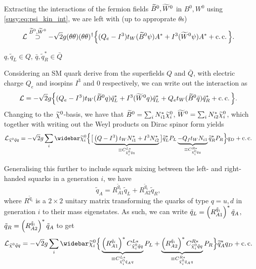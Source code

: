 \documentclass[../main.tex]{subfiles}
\begin{document}
Extracting the interactions of the fermion fields \(\bino, \wino\) in \(B^0,
W^0\) using \cref{susy:eq:psi_kin_int}, we are left with (up to approprate
\(\theta\)s)
\begin{equation}
  \L \stackrel{\bino, \wino}{\supset} -\sqrt{2}g (\theta\theta)(\theta\theta)^\dagger \Big\{ (Q_e - I^3)t_W (\bino \psi) A^\ast + I^3 (\wino \psi) A^\ast + \cc \Big\}.
\end{equation}

\begin{temporary}
  \(q, \tilde{q}_L \in Q\), \(\bar{q}, \tilde{q}_R^\ast \in \bar{Q}\)
\end{temporary}

Considering an SM quark derive from the superfields \(Q\) and \(\bar{Q}\), with
electric charge \(Q_e\) and isospins \(I^3\) and 0 respectively, we can write
out the interaction as
\begin{equation}
  \L = -\sqrt{2}g \Big\{ (Q_e - I^3)t_W (\bino q) \tilde{q}_L^\ast + I^3 (\wino q) \tilde{q}_L^\ast + Q_e t_W (\bino \bar{q}) \tilde{q}_R^\ast + \cc \Big\}.
\end{equation}
Changing to the \(\nino\)-basis, we have that \(\bino = \sum_i N_{i1}^\ast \nino[i]\), \(\wino = \sum_i N_{i2}^\ast \nino[i]\), which together with writing out the Weyl products on Dirac spinor form yields
\begin{equation}
  \label{susy:eq:nino_sf_f_int}
  \L_{\tilde{\chi}^0 \tilde{q}q} = -\sqrt{2} g \sum_{i} \barnino[i] \Big\{ \big[ \underbrace{\pclosed{Q - I^3}t_W N_{i1}^\ast  + I^3 N_{i2}^\ast}_{\equiv C_{\tilde{\chi}^0_i \tilde{q} q}^{L\ast}} \big] \wtilde{q}_L^\ast P_L \underbrace{- Q_f t_W N_{i1}}_{\equiv C_{\tilde{\chi}^0_i \tilde{q} q}^{R\ast}} \wtilde{q}_R^\ast P_R \Big\} q_D + \cc
\end{equation}

Generalising this further to include squark mixing between the left- and
right-handed squarks in a generation \(i\), we have
\begin{equation}
  \tilde{q}_A = R_{A1}^{\tilde{q}_i} \tilde{q}_L + R_{A2}^{\tilde{q}_i} \tilde{q}_R,
\end{equation}
where \(R^{\tilde{q}_i}\) is a \(2\times 2\) unitary matrix transforming the quarks of type \(q = u, d\) in generation \(i\) to their mass eigenstates.
As such, we can write \(\tilde{q}_L = \pclosed{R^{\tilde{q}_i}_{A1}}^\ast \tilde{q}_A\), \(\tilde{q}_R = \pclosed{R^{\tilde{q}_i}_{A2}}^\ast \tilde{q}_A\) to get
\begin{equation}
  \label{susy:eq:nino_sqA_f_int}
  \L_{\tilde{\chi}^0 \tilde{q} q} = -\sqrt{2} g \sum_{i} \barnino[i] \Big\{ \underbrace{\pclosed{R^{\tilde{q}_i}_{A1}}^\ast C_{\tilde{\chi}^0_i \tilde{q} q}^{L\ast}}_{\equiv C_{\tilde{\chi}^0_i \tilde{q}_A q}^{L\ast}} P_L + \underbrace{\pclosed{R^{\tilde{q}_i}_{A2}}^\ast C_{\tilde{\chi}^0_i \tilde{q} q}^{R\ast}}_{\equiv C_{\tilde{\chi}^0_i \tilde{q}_A q}^{R\ast}} P_R \Big\} \wtilde{q}_A^\ast q_D + \cc
\end{equation}
\end{document}
